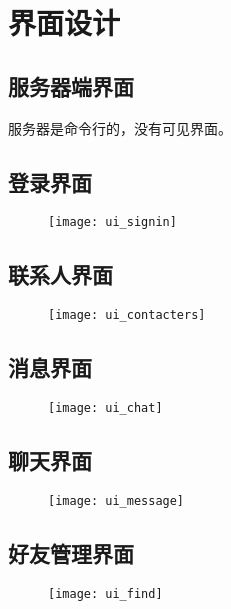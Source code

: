 \chapter{界面设计}
\section{服务器端界面}
服务器是命令行的，没有可见界面。

\section{登录界面}
\begin{figure}[h]
	\centering
	\texttt{[image: ui\_signin]}
\end{figure}

\section{联系人界面}
\begin{figure}[h]
	\centering
	\texttt{[image: ui\_contacters]}
\end{figure}
\section{消息界面}
\begin{figure}[h]
	\centering
	\texttt{[image: ui\_chat]}
\end{figure}
\section{聊天界面}
\begin{figure}[h]
	\centering
	\texttt{[image: ui\_message]}
\end{figure}
\section{好友管理界面}
\begin{figure}[h]
	\centering
	\texttt{[image: ui\_find]}
\end{figure}